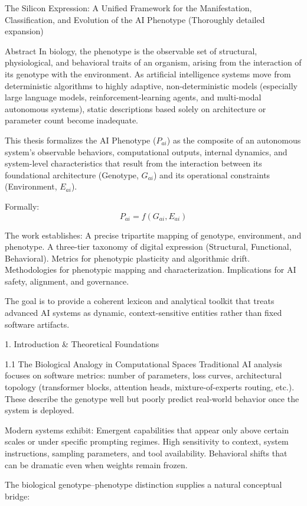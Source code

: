 The Silicon Expression: A Unified Framework for the Manifestation, Classification, and Evolution of the AI Phenotype  
(Thoroughly detailed expansion)

Abstract
In biology, the phenotype is the observable set of structural, physiological, and behavioral traits of an organism, arising from the interaction of its genotype with the environment. As artificial intelligence systems move from deterministic algorithms to highly adaptive, non-deterministic models (especially large language models, reinforcement-learning agents, and multi-modal autonomous systems), static descriptions based solely on architecture or parameter count become inadequate.

This thesis formalizes the AI Phenotype (\(P_{ai}\)) as the composite of an autonomous system’s observable behaviors, computational outputs, internal dynamics, and system-level characteristics that result from the interaction between its foundational architecture (Genotype, \(G_{ai}\)) and its operational constraints (Environment, \(E_{ai}\)).

Formally:
\[
P_{ai} = f(G_{ai}, E_{ai})
\]

The work establishes:
A precise tripartite mapping of genotype, environment, and phenotype.
A three-tier taxonomy of digital expression (Structural, Functional, Behavioral).
Metrics for phenotypic plasticity and algorithmic drift.
Methodologies for phenotypic mapping and characterization.
Implications for AI safety, alignment, and governance.

The goal is to provide a coherent lexicon and analytical toolkit that treats advanced AI systems as dynamic, context-sensitive entities rather than fixed software artifacts.

1. Introduction & Theoretical Foundations

1.1 The Biological Analogy in Computational Spaces
Traditional AI analysis focuses on software metrics: number of parameters, loss curves, architectural topology (transformer blocks, attention heads, mixture-of-experts routing, etc.). These describe the genotype well but poorly predict real-world behavior once the system is deployed.

Modern systems exhibit:
Emergent capabilities that appear only above certain scales or under specific prompting regimes.
High sensitivity to context, system instructions, sampling parameters, and tool availability.
Behavioral shifts that can be dramatic even when weights remain frozen.

The biological genotype–phenotype distinction supplies a natural conceptual bridge:

